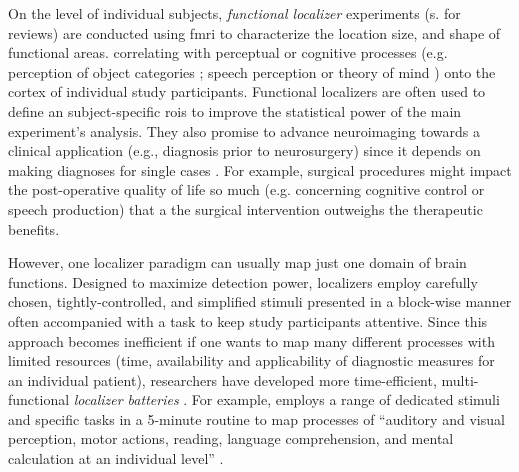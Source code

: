 


On the level of individual subjects, \textit{functional localizer} experiments
(s. \citep{saxe2006divide, friston2006critique} for reviews) are conducted using
\ac{fmri} to characterize the location size, and shape of functional areas.
correlating with perceptual or cognitive processes (e.g. perception of object
categories \citep{kanwisher1997ffa}; speech perception
\citep{fernandez2001language} or theory of mind \citep{spunt2014validating})
onto the cortex of individual study participants.
Functional localizers are often used to define an subject-specific \acp{roi} to
improve the statistical power of the main experiment's analysis.
They also promise to advance neuroimaging towards a clinical application (e.g.,
diagnosis prior to neurosurgery) since it depends on making diagnoses for single
cases \citep{wegrzyn2018thought}.
For example, surgical procedures might impact the post-operative quality of life
so much (e.g. concerning cognitive control or speech production) that a the
surgical intervention outweighs the therapeutic benefits.

However, one localizer paradigm can usually map just one domain of brain
functions.
Designed to maximize detection power, localizers employ carefully chosen,
tightly-controlled, and simplified stimuli presented in a block-wise manner
often accompanied with a task to keep study participants attentive.
Since this approach becomes inefficient if one wants to map many different
processes with limited resources (time, availability and applicability of
diagnostic measures for an individual patient), researchers have developed more
time-efficient, multi-functional \textit{localizer batteries}
\citep{barch2013function, drobyshevsky2006rapid, pinel2007fast}.
For example, \citet{pinel2007fast} employs a range of dedicated stimuli and
specific tasks in a 5-minute routine to map processes of ``auditory and visual
perception, motor actions, reading, language comprehension, and mental
calculation at an individual level'' \citep{pinel2007fast}.

